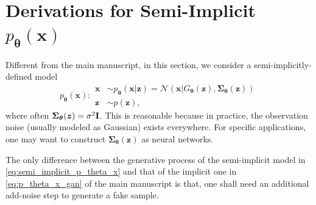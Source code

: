 \documentclass[letterpaper]{article} %
\newcommand{\beq}{\begin{equation}}
\newcommand{\eeq}{\end{equation}}
\newcommand{\bali}{\begin{aligned}}
\newcommand{\eali}{\end{aligned}}
\newcommand{\Nc}[0]{\ensuremath{\mathcal{N}} }
\newcommand{\Imat}[0]{\ensuremath{{\bf I}} }
\newcommand{\xv}[0]{\ensuremath{\boldsymbol{x}} }
\newcommand{\zv}[0]{\ensuremath{\boldsymbol{z}} }
\newcommand{\Sigmamat}[0]{\ensuremath{\boldsymbol{\Sigma}} }
\newcommand{\betav}[0]{\ensuremath{\boldsymbol{\beta}} }
\newcommand{\thetav}[0]{\ensuremath{\boldsymbol{\theta}} }
\begin{document}



\section{Derivations for Semi-Implicit $p_{\thetav}(\xv)$}
\label{sec:app_semi_implicit}



Different from the main manuscript, in this section, we consider a semi-implicitly-defined model  
\beq\label{eq:semi_implicit_p_theta_x}
p_{\thetav}(\xv): 
\bali
    \xv & \sim p_{\thetav}(\xv | \zv) = \Nc(\xv | G_{\thetav}(\zv), \Sigmamat_{\thetav}(\zv))
    \\
    \zv & \sim p(\zv),
\eali
\eeq
where often $\Sigmamat_{\thetav}(\zv) = \sigma^2 \Imat$. This is reasonable because in practice, the observation noise (usually modeled as Gaussian) exists everywhere.
For specific applications, one may want to construct $\Sigmamat_{\thetav}(\zv)$ as neural networks.

The only difference between the generative process of the semi-implicit model in \eqref{eq:semi_implicit_p_theta_x} and that of the implicit one in \eqref{eq:p_theta_x_gan} of the main manuscript is that, one shall need an additional add-noise step to generate a fake sample.
\end{document}
